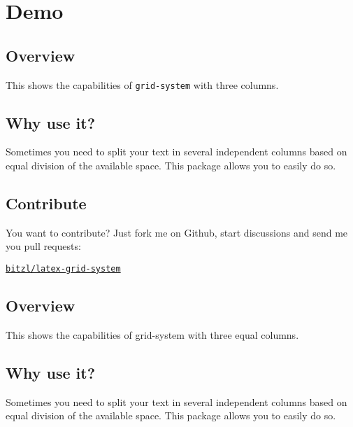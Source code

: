 \documentclass[DIV12]{scrartcl}
\begin{document}
\section{Demo}
\blindtext

\begin{row}[cellsep=0.5cm]{3}
	\begin{cell}{1}
	\section*{Overview}
	\vspace{-1.5ex}
	This shows the capabilities of \texttt{grid-system} with three columns.
	\end{cell}
	\begin{cell}{1}
	\section*{Why use it?}
	\vspace{-1.5ex}
	Sometimes you need to split your text in several independent columns based on equal division of the available space. This package allows you to easily do so.
	\end{cell}
	\begin{cell}{1}
	\section*{Contribute}
	\vspace{-1.5ex}
	You want to contribute? Just fork me on Github, start discussions and send me you pull requests: %
	\begin{center}
	\href{https://github.com/bitzl/latex-grid-system}{\tt bitzl/latex-grid-system}
	\end{center}
	\end{cell}
\end{row}

\begin{row}{3}
	\begin{cell}{1}
	\section*{Overview}
	\vspace{-1.5ex}
	This shows the capabilities of grid-system with three equal columns.
	\end{cell}
	\begin{cell}{2}
	\section*{Why use it?}
	\vspace{-1.5ex}
	Sometimes you need to split your text in several independent columns based on equal division of the available space. This package allows you to easily do so.
	\end{cell}
\end{row}
\end{document}
